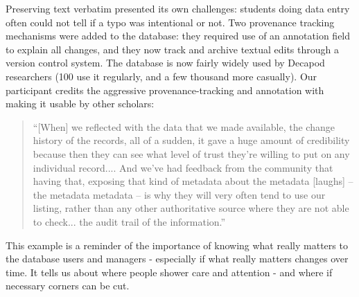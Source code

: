 Preserving text verbatim presented its own challenges: students doing data entry often could not tell if a typo was intentional or not. Two provenance tracking mechanisms were added to the database: they required use of an annotation field to explain all changes, and they now track and archive textual edits through a version control system. The database is now fairly widely used by Decapod researchers (100 use it regularly, and a few thousand more casually). Our participant credits the aggressive provenance-tracking and annotation with making it usable by other scholars:
\begin{quote}
“[When] we reflected with the data that we made available, the change history of the records, all of a sudden, it gave a huge amount of credibility because then they can see what level of trust they're willing to put on any individual record.... And we've had feedback from the community that having that, exposing that kind of metadata about the metadata [laughs] – the metadata metadata – is why they will very often tend to use our listing, rather than any other authoritative source where they are not able to check... the audit trail of the information.”
\end{quote}

This example is a reminder of the importance of knowing what really matters to the database users and managers - especially if what really matters changes over time. It tells us about where people shower care and attention - and where if necessary corners can be cut.  